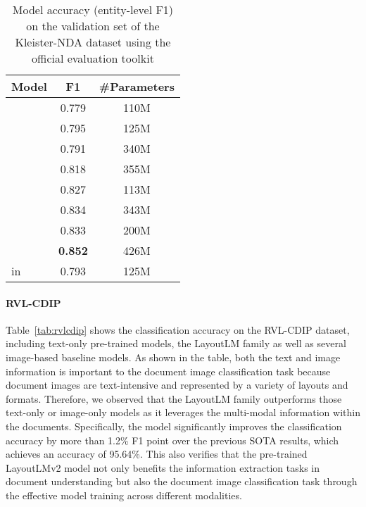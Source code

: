 \documentclass{article} \usepackage{iclr2021_conference,times}
\begin{document}
\begin{table}[ht]
    \centering
    \small
\begin{tabular}{lcc}
    \toprule
     \multicolumn{1}{c}{\bf Model} & \bf F1 & \bf \#Parameters  \\\midrule
      & 0.779 & 110M \\
 & 0.795 & 125M  \\
      & 0.791 & 340M \\
      & 0.818 & 355M \\\midrule
      & 0.827 & 113M \\
      & 0.834 & 343M \\\midrule
      & 0.833 & 200M \\
      & \bf 0.852 & 426M \\\midrule\midrule
      in~\citep{graliski2020kleister} & 0.793 & 125M \\
     \bottomrule
    \end{tabular}
    \caption{Model accuracy (entity-level F1) on the validation set of the Kleister-NDA dataset using the official evaluation toolkit}
    \label{tab:kleister-nda}
\end{table}









\paragraph{RVL-CDIP}


Table~\ref{tab:rvlcdip} shows the classification accuracy on the RVL-CDIP dataset, including text-only pre-trained models, the LayoutLM family as well as several image-based baseline models. As shown in the table, both the text and image information is important to the document image classification task because document images are text-intensive and represented by a variety of layouts and formats. Therefore, we observed that the LayoutLM family outperforms those text-only or image-only models as it leverages the multi-modal information within the documents. Specifically, the  model significantly improves the classification accuracy by more than 1.2\% F1 point over the previous SOTA results, which achieves an accuracy of 95.64\%. This also verifies that the pre-trained LayoutLMv2 model not only benefits the information extraction tasks in document understanding but also the document image classification task through the effective model training across different modalities.
\end{document}
